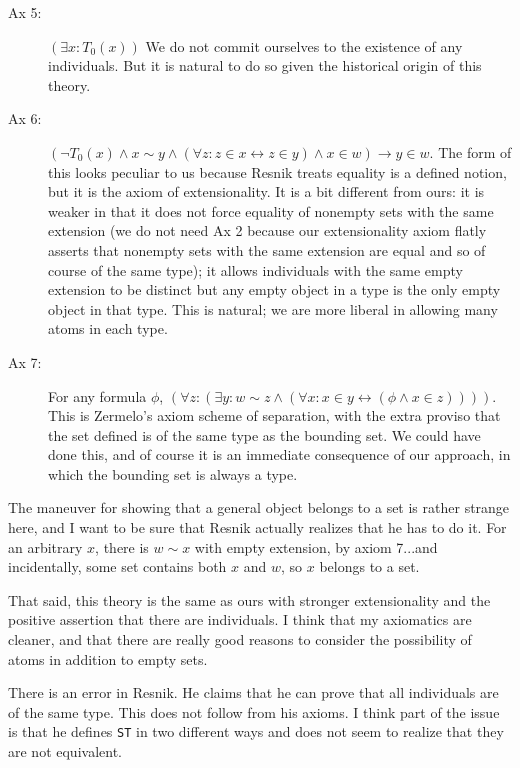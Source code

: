 \documentclass[12pt]{article}
\begin{document}
\begin{description}
\item[Ax 5:]  $(\exists x:T_0(x))$  We do not commit ourselves to the existence of any individuals.  But it is natural to do so given the historical origin of this theory.

\item[Ax 6:]  $(\neg T_0(x) \wedge x \sim y \wedge (\forall z:z \in x \leftrightarrow z \in y) \wedge x \in w) \rightarrow y \in w$.  The form of this looks peculiar to us because Resnik treats equality is a defined notion, but it is the axiom of extensionality.  It is a bit different from ours:  it is weaker in that it does not force equality of nonempty sets with the same extension (we do not need Ax 2 because our extensionality axiom flatly asserts that nonempty sets with the same extension are equal and so of course of the same type);  it allows individuals with the same empty extension to be distinct but any empty object in a type is the only empty object in that type.  This is natural;  we are more liberal in allowing many atoms in each type.

\item[Ax 7:] For any formula $\phi$, $(\forall z:(\exists y:w \sim z \wedge (\forall x:x \in y \leftrightarrow (\phi \wedge x \in z))))$.  This is Zermelo's axiom scheme of separation, with the extra proviso that the set defined is of the same type as the bounding set.  We could have done this, and of course it is an immediate consequence of our approach, in which the bounding set is always a type.

\end{description}

The maneuver for showing that a general object belongs to a set is rather strange here, and I want to be sure that Resnik actually realizes that he has to do it.
For an arbitrary $x$, there is $w \sim x$ with empty extension, by axiom 7...and incidentally, some set contains both $x$ and $w$, so $x$ belongs to a set.

That said, this theory is the same as ours with stronger extensionality and the positive assertion that there are individuals.  I think that my axiomatics are cleaner, and that there are really good reasons to consider the possibility of atoms in addition to empty sets.

There is an error in Resnik.  He claims that he can prove that all individuals are of the same type.  This does not follow from his axioms.  I think part of the issue is that he defines {\tt ST} in two different ways and does not seem to realize that they are not equivalent.
\end{document}
